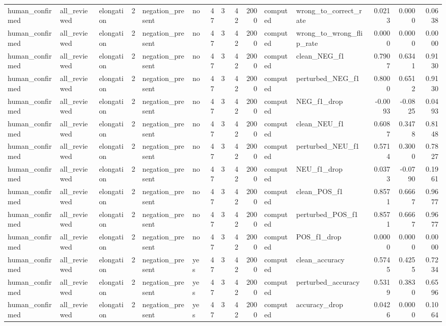 \begin{tabular}{lllrllrrrrllrrr}
human_confirmed & all_reviewed & elongation & 2 & negation_present & no & 47 & 3 & 42 & 2000 & computed & wrong_to_correct_rate & 0.0213 & 0.0000 & 0.0638 \\
human_confirmed & all_reviewed & elongation & 2 & negation_present & no & 47 & 3 & 42 & 2000 & computed & wrong_to_wrong_flip_rate & 0.0000 & 0.0000 & 0.0000 \\
human_confirmed & all_reviewed & elongation & 2 & negation_present & no & 47 & 3 & 42 & 2000 & computed & clean_NEG_f1 & 0.7907 & 0.6341 & 0.9130 \\
human_confirmed & all_reviewed & elongation & 2 & negation_present & no & 47 & 3 & 42 & 2000 & computed & perturbed_NEG_f1 & 0.8000 & 0.6512 & 0.9130 \\
human_confirmed & all_reviewed & elongation & 2 & negation_present & no & 47 & 3 & 42 & 2000 & computed & NEG_f1_drop & -0.0093 & -0.0825 & 0.0493 \\
human_confirmed & all_reviewed & elongation & 2 & negation_present & no & 47 & 3 & 42 & 2000 & computed & clean_NEU_f1 & 0.6087 & 0.3478 & 0.8148 \\
human_confirmed & all_reviewed & elongation & 2 & negation_present & no & 47 & 3 & 42 & 2000 & computed & perturbed_NEU_f1 & 0.5714 & 0.3000 & 0.7827 \\
human_confirmed & all_reviewed & elongation & 2 & negation_present & no & 47 & 3 & 42 & 2000 & computed & NEU_f1_drop & 0.0373 & -0.0790 & 0.1961 \\
human_confirmed & all_reviewed & elongation & 2 & negation_present & no & 47 & 3 & 42 & 2000 & computed & clean_POS_f1 & 0.8571 & 0.6667 & 0.9677 \\
human_confirmed & all_reviewed & elongation & 2 & negation_present & no & 47 & 3 & 42 & 2000 & computed & perturbed_POS_f1 & 0.8571 & 0.6667 & 0.9677 \\
human_confirmed & all_reviewed & elongation & 2 & negation_present & no & 47 & 3 & 42 & 2000 & computed & POS_f1_drop & 0.0000 & 0.0000 & 0.0000 \\
human_confirmed & all_reviewed & elongation & 2 & negation_present & yes & 47 & 3 & 42 & 2000 & computed & clean_accuracy & 0.5745 & 0.4255 & 0.7234 \\
human_confirmed & all_reviewed & elongation & 2 & negation_present & yes & 47 & 3 & 42 & 2000 & computed & perturbed_accuracy & 0.5319 & 0.3830 & 0.6596 \\
human_confirmed & all_reviewed & elongation & 2 & negation_present & yes & 47 & 3 & 42 & 2000 & computed & accuracy_drop & 0.0426 & 0.0000 & 0.1064 \\

\end{tabular}
